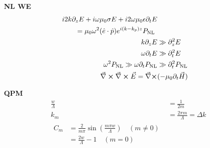 \documentclass[12pt]{article}
\begin{document}
\begin{multicols}{3}
\textbf{NL WE}
\begin{align}
  \begin{split}
    i2k\partial_zE + i\omega\mu_0\sigma E &+ i2\omega\mu_0\epsilon \partial_t E\\
    = \mu_0\omega^2(\hat{e} \cdot \hat{p})&e^{i(k-k_p)z}P_{\textrm{NL}}
  \end{split}\\
  k \partial_z E &\gg \partial_z^2 E\\
  \omega \partial_t E &\gg \partial_t^2 E\\
  \omega^2 P_{\textrm{NL}} \gg \omega \partial_t P_{\textrm{NL}} &\gg \partial_t^2 P_{\textrm{NL}}\\
  \vec{\nabla} \cross \vec{\nabla} \cross \vec{E} = \vec{\nabla} \cross &(-\mu_0 \partial_t \vec{H})
\end{align}


\textbf{QPM}
\begin{align}
  \frac{w}{\Lambda} &= \frac{1}{2m}\\
  k_{m} &= \frac{2\pi m}{\Lambda} = \Delta k\\
  \begin{split}
    C_m &= \frac{2}{m\pi}\sin(\frac{m\pi w}{\Lambda}) \quad (m \neq 0)\\
    &= \frac{2w}{\Lambda} - 1 \quad (m = 0)
  \end{split}
\end{align}


\end{multicols}
\end{document}

